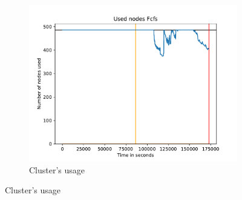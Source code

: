\documentclass[a4paper]{article}
\begin{document}
\begin{figure}[H]\centering
\begin{subfigure}[b]{0.4\linewidth}\centering\includegraphics[width=1\linewidth]{MBSS/plot/2022-01-21->2022-01-21_V9271_Fcfs_Used_nodes_450_128_32_256_4_1024.pdf}\caption{Cluster's usage}\end{subfigure}

\end{figure}
\end{document}
